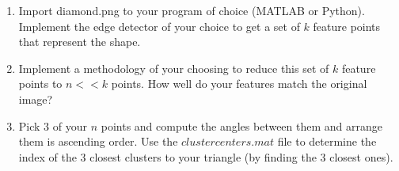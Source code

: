 \documentclass[paper=a4, fontsize=11pt]{scrartcl} %
\begin{document}
\begin{enumerate}
  \item
  Import diamond.png to your program of choice (MATLAB or Python). Implement the edge detector of your choice to get a set of $k$ feature points that represent the shape. 
  \item 
  Implement a methodology of your choosing to reduce this set of $k$ feature points to $n << k$  points. How well do your features match the original image?

  \item
    Pick $3$ of your $n$ points and compute the angles between them and arrange them is ascending order. Use the $clustercenters.mat$ file to determine the index of the 3 closest clusters to your triangle (by finding the 3 closest ones).
    

\end{enumerate}
\end{document}

